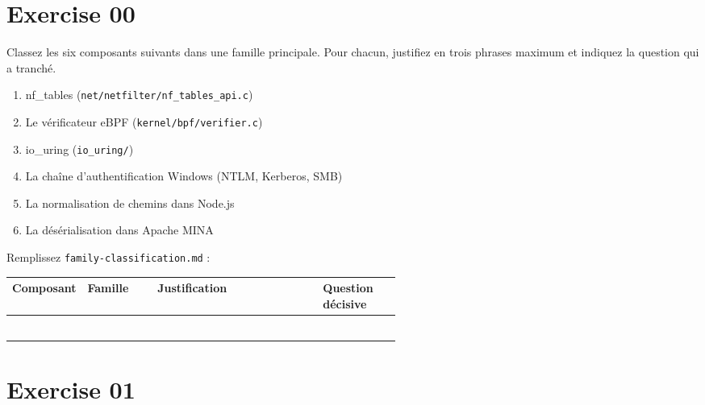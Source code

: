 \documentclass{training}
\begin{document}
\startexercices

\chapter{Exercise 00}
\makeheaderfiles

Classez les six composants suivants dans une famille principale. Pour
chacun, justifiez en trois phrases maximum et indiquez la question qui a
tranché.

\begin{enumerate}
  \item nf\_tables (\texttt{net/netfilter/nf\_tables\_api.c})
  \item Le vérificateur eBPF (\texttt{kernel/bpf/verifier.c})
  \item io\_uring (\texttt{io\_uring/})
  \item La chaîne d'authentification Windows (NTLM, Kerberos, SMB)
  \item La normalisation de chemins dans Node.js
  \item La désérialisation dans Apache MINA
\end{enumerate}

Remplissez \texttt{family-classification.md} :

\begin{center}
\begin{tabularx}{\linewidth}{|p{0.18\linewidth}|p{0.18\linewidth}|X|p{0.2\linewidth}|}
\hline
\textbf{Composant} & \textbf{Famille} & \textbf{Justification} & \textbf{Question décisive} \\ \hline
 & & & \\ \hline
 & & & \\ \hline
 & & & \\ \hline
 & & & \\ \hline
 & & & \\ \hline
 & & & \\ \hline
\end{tabularx}
\end{center}


\chapter{Exercise 01}
\makeheaderfiles
\end{document}
